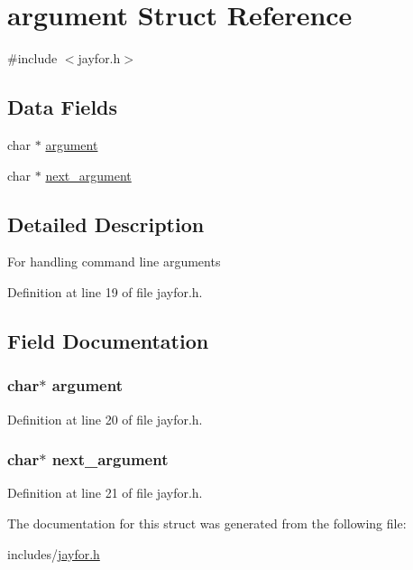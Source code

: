 \hypertarget{structargument}{\section{argument Struct Reference}
\label{structargument}
}


{\ttfamily \#include $<$jayfor.\+h$>$}

\subsection*{Data Fields}
\begin{DoxyCompactItemize}
\item 
char $\ast$ \hyperlink{structargument_a0b9dd1c76cc75850dd98d79ae3da5227}{argument}
\item 
char $\ast$ \hyperlink{structargument_a5a2510e0f7136e387bb61ede9e50b393}{next\+\_\+argument}
\end{DoxyCompactItemize}


\subsection{Detailed Description}
For handling command line arguments 

Definition at line 19 of file jayfor.\+h.



\subsection{Field Documentation}
\hypertarget{structargument_a0b9dd1c76cc75850dd98d79ae3da5227}{
\subsubsection[{argument}]{\setlength{\rightskip}{0pt plus 5cm}char$\ast$ {\bf argument}}}\label{structargument_a0b9dd1c76cc75850dd98d79ae3da5227}


Definition at line 20 of file jayfor.\+h.

\hypertarget{structargument_a5a2510e0f7136e387bb61ede9e50b393}{
\subsubsection[{next\+\_\+argument}]{\setlength{\rightskip}{0pt plus 5cm}char$\ast$ next\+\_\+argument}}\label{structargument_a5a2510e0f7136e387bb61ede9e50b393}


Definition at line 21 of file jayfor.\+h.



The documentation for this struct was generated from the following file\+:\begin{DoxyCompactItemize}
\item 
includes/\hyperlink{jayfor_8h}{jayfor.\+h}\end{DoxyCompactItemize}
